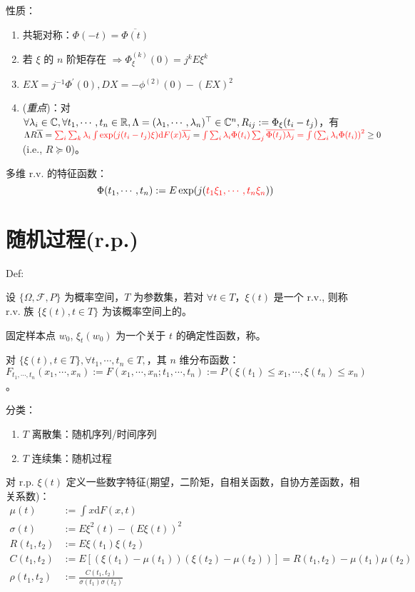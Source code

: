 性质：
\begin{enumerate}
	\item 共轭对称：$\Phi(-t) = \overline{\Phi(t)}$
	\item 若 $\xi$ 的 $n$ 阶矩存在 $\Rightarrow \Phi_{\xi}^{(k)}(0) = j^k E\xi^k$
	\item $EX = j^{-1} \Phi^\prime(0), DX = - \phi^{(2)}(0) - (EX)^2$
	\item {}(\emph{重点})：对$\forall \lambda_i \in \mathbb{C}, \forall t_1,\cdots,t_n \in \mathbb{R}, \Lambda = (\lambda_1, \cdots, \lambda_n)^\top \in \mathbb{C}^{n}, R_{ij} := \Phi_\xi(t_i - t_j)$，有 $\Lambda R \overline{\Lambda} = \textcolor{red}{\sum_i \sum_k \lambda_i \int \exp(j(t_i - t_j)\xi)\mathrm{d}F(x) \overline{\lambda_j}} = \textcolor{red}{\int \sum_i \lambda_i \Phi(t_i) \sum_j \overline{\Phi(t_j)\lambda_j} = \int \left(\sum_i \lambda_i \Phi(t_i)\right)^2}\ge 0$(i.e., $R\succeq 0$)。
\end{enumerate}

多维 r.v. 的特征函数：
\begin{equation}
	\Phi(t_1, \cdots, t_n) := E \exp(j(\textcolor{red}{t_1 \xi_1, \cdots, t_n \xi_n}))
\end{equation}

\section{随机过程(r.p.)}

Def:

设 $\{\Omega, \mathcal{F}, P\}$ 为概率空间，$T$ 为参数集，若对 $\forall t \in T$，$\xi(t)$ 是一个 r.v., 则称 r.v. 族 $\{\xi(t), t\in T\}$ 为该概率空间上的。

固定样本点 $w_0$, $\xi_t(w_0)$ 为一个关于 $t$ 的确定性函数，称。


对 $\{\xi(t), t \in T\}, \forall t_1, \cdots, t_n \in T,$，其 $n$ 维分布函数：$F_{t_1,\cdots,t_n}(x_1, \cdots, x_n) := F(x_1, \cdots, x_n; t_1, \cdots, t_n) := P(\xi(t_1)\le x_1,\cdots, \xi(t_n)\le x_n)$。

分类：
\begin{enumerate}
	\item $T$ 离散集：随机序列/时间序列
	\item $T$ 连续集：随机过程
\end{enumerate}

对 r.p. $\xi(t)$ 定义一些数字特征(期望，二阶矩，自相关函数，自协方差函数，相关系数)：
\begin{align*}
	\mu(t) &:= \int x \mathrm{d}F(x,t) \\
	\sigma(t) &:= E\xi^2(t) - (E\xi(t))^2 \\
	R(t_1,t_2) &:= E\xi(t_1)\xi(t_2) \\
	C(t_1,t_2) &:= E[(\xi(t_1) - \mu(t_1))(\xi(t_2) - \mu(t_2))] = R(t_1, t_2) - \mu(t_1)\mu(t_2)\\
	\rho(t_1,t_2) &:= \frac{C(t_1,t_2)}{\sigma(t_1)\sigma(t_2)}
\end{align*}

